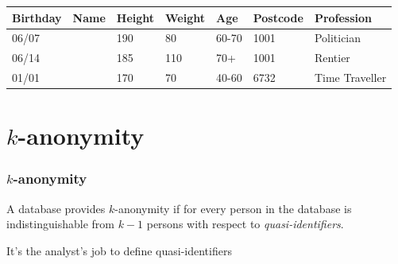 \begin{frame}
  \begin{example}
    \begin{table}[H]
      \begin{tabular}{l|l|l|l|l|l|l}
        Birthday & Name & Height  & Weight & Age & Postcode & Profession\\
        \hline
        06/07 & & 190 & 80 & 60-70 & 1001 & Politician\\
        06/14 &  & 185 & 110 & 70+ & 1001 & Rentier\\
        01/01 &  & 170 & 70 & 40-60 & 6732 & Time Traveller
      \end{tabular}
    \end{table}
  \end{example}
\end{frame}

\section{$k$-anonymity}

\begin{frame}
  \frametitle{$k$-anonymity}
  \begin{figure}[H]
    \centering {}
  \end{figure}

  \begin{definition}[$k$-anonymity]
    A database provides $k$-anonymity if for every person in the database is indistinguishable from $k-1$ persons with respect to \emph{quasi-identifiers}.
  \end{definition}
  \alert{It's the analyst's job to define quasi-identifiers}
  
\end{frame}

